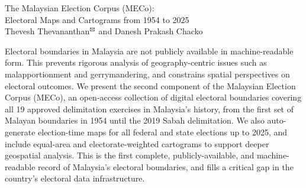 \documentclass[11pt]{article}
\begin{document}
\def\acronymend{MECo}
\def\acronym{\acronymend\space}

\def\TOTALBALLOTS{25,545}
\def\TOTALCONTESTS{9,704}
\def\TOTALPARTIES{110}
\def\TOTALCOALITIONS{18}
\def\TOTALCONTESTSSTATE{6,936}
\def\TOTALCONTESTSFEDERAL{2,715}
\def\TOTALCONTESTSBYELEC{53}
\def\TOTALELECTIONS{16}
\def\UNIQUECANDIDATES{14,000}
\def\TOTALCORRECTIONS{114}

\phantom{Thevesh}

\vfill

\begin{center}
	\begin{minipage}{0.88\linewidth}
		\begin{center}
			\LARGE
			The Malaysian Election Corpus (\acronymend):\\Electoral Maps and Cartograms from 1954 to 2025\\[0.21in]
			\Large
			Thevesh Thevananthan\footnotemark$^{\text{\Letter}}$ and Danesh Prakash Chacko\footnotemark\\[0.15in]
		\end{center}
		\large
		Electoral boundaries in Malaysia are not publicly available in machine-readable form. This prevents rigorous analysis of geography-centric issues such as malapportionment and gerrymandering, and constrains spatial perspectives on electoral outcomes. We present the second component of the Malaysian Election Corpus (MECo), an open-access collection of digital electoral boundaries covering all 19 approved delimitation exercises in Malaysia's history, from the first set of Malayan boundaries in 1954 until the 2019 Sabah delimitation. We also auto-generate election-time maps for all federal and state elections up to 2025, and include equal-area and electorate-weighted cartograms to support deeper geospatial analysis. This is the first complete, publicly-available, and machine-readable record of Malaysia's electoral boundaries, and fills a critical gap in the country's electoral data infrastructure.
	\end{minipage}
\end{center}


\vfill

\phantom{Word Count:}
\end{document}
